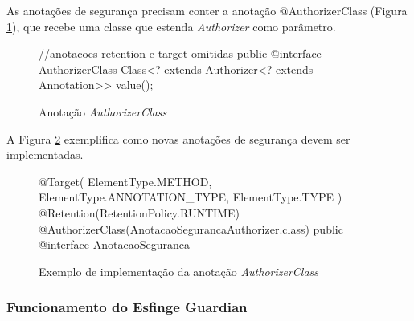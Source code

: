 \par As anotações de segurança precisam conter a anotação @AuthorizerClass (Figura \ref{fig:anotacao-authorizer-class}), que recebe uma classe que estenda \textit{Authorizer} como parâmetro.

\begin{figure}[H]
    \centering
    \caption{Anotação \textit{AuthorizerClass}}
    \begin{java}
//anotacoes retention e target omitidas
public @interface AuthorizerClass {
	Class<? extends Authorizer<? extends Annotation>> value();
}

    \end{java}
    \label{fig:anotacao-authorizer-class}
\end{figure}

\par A Figura \ref{fig:anotacao-seguranca} exemplifica como novas anotações de segurança devem ser implementadas.

\begin{figure}[H]
    \centering
    \caption{Exemplo de implementação da anotação \textit{AuthorizerClass}}
    \begin{java}
@Target({ ElementType.METHOD, ElementType.ANNOTATION_TYPE, ElementType.TYPE })
@Retention(RetentionPolicy.RUNTIME)
@AuthorizerClass(AnotacaoSegurancaAuthorizer.class) 
public @interface AnotacaoSeguranca { 
}
    \end{java}
    \label{fig:anotacao-seguranca}
\end{figure}

\subsubsection{Funcionamento do Esfinge Guardian}

